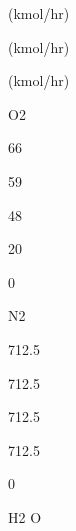 \documentclass[a4paper,portrait,12pt]{article}
\begin{document}
\begin{flushleft}
(kmol/hr)
\end{flushleft}





\begin{flushleft}
(kmol/hr)
\end{flushleft}


\begin{flushleft}
(kmol/hr)
\end{flushleft}





\begin{flushleft}
O2
\end{flushleft}





66





59





48





20





0





\begin{flushleft}
N2
\end{flushleft}





712.5





712.5





712.5





712.5





0





\begin{flushleft}
H2 O
\end{flushleft}
\end{document}
